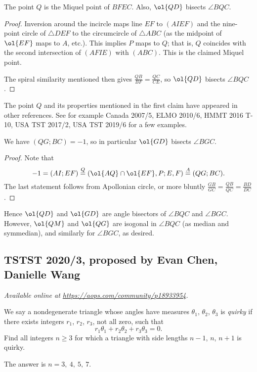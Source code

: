 \documentclass[11pt]{scrartcl}
\begin{document}
\begin{claim*}
  The point $Q$ is the Miquel point of $BFEC$.
  Also, $\ol{QD}$ bisects $\angle BQC$.
\end{claim*}
\begin{proof}
  Inversion around the incircle maps line $EF$ to $(AIEF)$
  and the nine-point circle of $\triangle DEF$
  to the circumcircle of $\triangle ABC$
  (as the midpoint of $\ol{EF}$ maps to $A$, etc.).
  This implies $P$ maps to $Q$; that is, $Q$ coincides with
  the second intersection of $(AFIE)$ with $(ABC)$.
  This is the claimed Miquel point.

  The spiral similarity mentioned then gives
  $\frac{QB}{BF} = \frac{QC}{CE}$, so $\ol{QD}$ bisects $\angle BQC$.
\end{proof}

\begin{remark*}
  The point $Q$ and its properties mentioned in the first claim
  have appeared in other references.
  See for example Canada 2007/5, ELMO 2010/6,
  HMMT 2016 T-10, USA TST 2017/2, USA TST 2019/6 for a few examples.
\end{remark*}

\begin{claim*}
  We have $(QG;BC) = -1$, so in particular $\ol{GD}$ bisects $\angle BGC$.
\end{claim*}
\begin{proof}
  Note that
  \[ -1 = (AI;EF) \overset{Q}{=} (\ol{AQ} \cap \ol{EF}, P; E, F)
    \overset{A}{=} (QG;BC). \]
  The last statement follows from Apollonian circle,
  or more bluntly $\frac{GB}{GC} = \frac{QB}{QC} = \frac{BD}{DC}$.
\end{proof}

Hence $\ol{QD}$ and $\ol{GD}$ are angle bisectors of $\angle BQC$ and $\angle BGC$.
However, $\ol{QM}$ and $\ol{QG}$ are isogonal in $\angle BQC$
(as median and symmedian), and similarly for $\angle BGC$, as desired.
\pagebreak

\subsection{TSTST 2020/3, proposed by Evan Chen, Danielle Wang}
\textsl{Available online at \url{https://aops.com/community/p18933954}.}
\begin{mdframed}[style=mdpurplebox,frametitle={Problem statement}]
We say a nondegenerate triangle whose angles have
measures $\theta_1$, $\theta_2$, $\theta_3$ is \emph{quirky}
if there exists integers $r_1$, $r_2$, $r_3$, not all zero,
such that \[ r_1 \theta_1 + r_2 \theta_2 + r_3 \theta_3 = 0. \]
Find all integers $n \ge 3$ for which a triangle with
side lengths $n-1$, $n$, $n+1$ is quirky.
\end{mdframed}
The answer is $n = 3,\ 4,\ 5,\ 7$.
\end{document}
